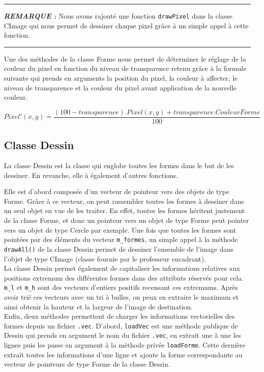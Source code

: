 \documentclass[11pt]{article}
\newenvironment{rmq}[1] {\noindent\HRule\par\vspace{5pt}\textbf{\textit{REMARQUE : }}#1}{\\\HRule\par\vspace{5pt}}
\newcommand{\HRule}{\rule{\linewidth}{0.5mm}}
\begin{document}
\begin{rmq}
    Nous avons rajouté une fonction \texttt{drawPixel} dans la classe CImage qui nous permet de dessiner chaque pixel grâce à un simple appel à cette fonction. 
\end{rmq}

Une des méthodes de la classe Forme nous permet de déterminer le réglage de la couleur du pixel en fonction du niveau de transparence retenu grâce à la formule suivante qui prends en arguments la position du pixel, la couleur à affecter, le niveau de transparence et la couleur du pixel avant application de la nouvelle couleur.  

$$Pixel'(x, y) = \frac{(100 - transparence).Pixel(x, y) + transparence.CouleurForme}{100}$$

\subsection{Classe Dessin}

La classe Dessin est la classe qui englobe toutes les formes dans le but de les dessiner. En revanche, elle à également d'autres fonctions. 

Elle est d'abord composée d'un vecteur de pointeur vers des objets de type Forme. Grâce à ce vecteur, on peut rassembler toutes les formes à dessiner dans un seul objet en vue de les traiter. En effet, toutes les formes héritent justement de la classe Forme, et donc un pointeur vers un objet de type Forme peut pointer vers un objet de type Cercle par exemple. Une fois que toutes les formes sont pointées par des éléments du vecteur \texttt{m\_formes}, un simple appel à la méthode \texttt{drawAll()} de la classe Dessin permet de dessiner l'ensemble de l'image dans l'objet de type CImage (classe fournie par le professeur encadrant). \\

La classe Dessin permet également de capitaliser les informations relatives aux positions extremum des différentes formes dans des attributs réservés pour cela. \texttt{m\_l} et \texttt{m\_h} sont des vecteurs d'entiers positifs recensant ces extremums. Après avoir trié ces vecteurs avec un tri à bulles, on peux en extraire le maximum et ainsi obtenir la hauteur et la largeur de l'image de destination. \\

Enfin, deux méthodes permettent de charger les informations vectorielles des formes depuis un fichier \texttt{.vec}. D'abord, \texttt{loadVec} est une méthode publique de Dessin qui prends en argument le nom du fichier \texttt{.vec}, en extrait une à une les lignes puis les passe en argument à la méthode privée \texttt{loadForme}. Cette dernière extrait toutes les informations d'une ligne et ajoute la forme correspondante au vecteur de pointeurs de type Forme de la classe Dessin. 
\end{document}
